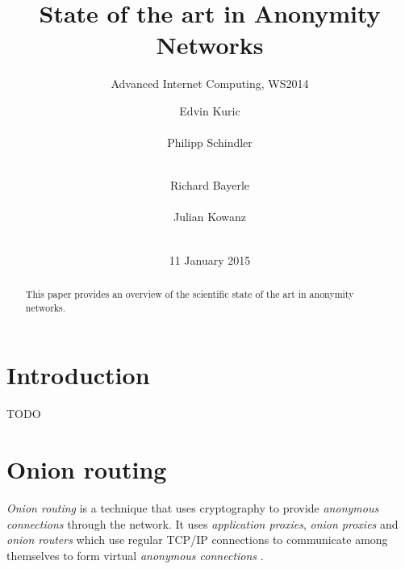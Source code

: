 \documentclass{sig-alternate}
\begin{document}
%

\title{State of the art in Anonymity Networks}
\subtitle{Advanced Internet Computing, WS2014}

\author{
\alignauthor
Edvin Kuric\\
       \\
\alignauthor
Philipp Schindler\\
       \\
\and
\alignauthor Richard Bayerle\\
       \\
\alignauthor Julian Kowanz\\
       \\
}
\date{11 January 2015}
\maketitle


\begin{abstract}
This paper provides an overview of the scientific state of the art in anonymity networks.
\end{abstract}


\section{Introduction}
TODO

\section{Onion routing}
\emph{Onion routing} is a technique that uses cryptography to provide \emph{anonymous connections}
through the network. It uses \emph{application proxies}, \emph{onion proxies} and
\emph{onion routers} which use regular TCP/IP connections to communicate among themselves
to form virtual \emph{anonymous connections} \cite{reed1998}.
\end{document}
